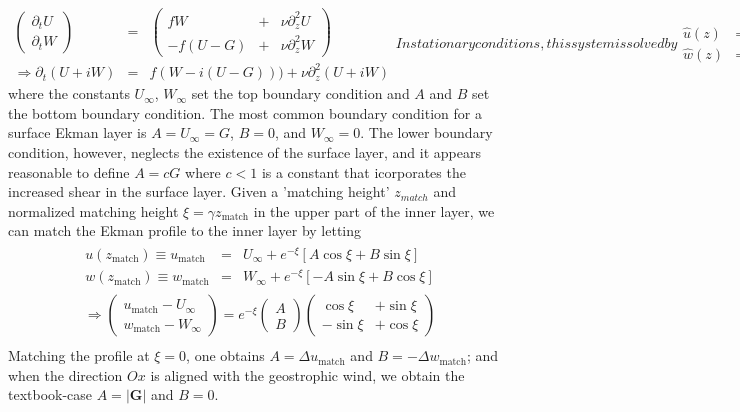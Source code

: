 \documentclass[smallcondensed,final]{svjour3}
\newcommand{\p}{\partial}
\newcommand{\gzm}{{\xi}}%
\begin{document}
\begin{subequations}
\begin{eqnarray}
  \left(\begin{matrix}
    \p_t U\\
    \p_t W  
  \end{matrix}\right)&=&\left(\begin{matrix}
     fW &+& \nu \p_z^2 U\\ 
    -f(U-G) &+& \nu \p_z^2 W
  \end{matrix}\right)\\ 
  \Rightarrow \partial_t (U+iW) &=& f(W-i(U-G))) + \nu \p_z^2(U+iW)
\end{eqnarray}
In stationary conditions, this system is solved by
\begin{eqnarray}
  \hat{u}(z) &=& U_{\infty} + e^{-\gamma z} \left[A \cos\gamma z + B \sin\gamma z\right]   \\
  \hat{w}(z) &=& W_{\infty} + e^{-\gamma z} \left[-A \sin\gamma z + B \cos\gamma z\right]
\end{eqnarray} 
\end{subequations}
where the constants $U_\infty$, $W_\infty$ set the top boundary condition and $A$ and $B$ set the bottom boundary condition. 
%
The most common boundary condition for a surface Ekman layer is $A=U_{\infty}=G$, $B=0$, and $W_{\infty}=0$.
%
The lower boundary condition, however, neglects the existence of the surface layer, and it appears reasonable to define
$A=c G$ where $c<1$ is a constant that icorporates the increased shear in the surface layer.
%
Given a 'matching height' $z_{match}$ and normalized matching height $\xi=\gamma z_\text{match}$ in the upper part of the inner layer, we can match the Ekman profile
to the inner layer by letting
%
\begin{eqnarray}
  \begin{matrix} 
    u(z_\text{match}) \equiv u_\text{match} &=& U_{\infty} + e^{-\gzm} \left [ A \cos\gzm + B\sin\gzm \right] \\
    w(z_\text{match}) \equiv w_\text{match} &=& W_{\infty} + e^{-\gzm} \left [-A \sin\gzm + B\cos\gzm \right]
  \end{matrix} 
\end{eqnarray}
\begin{eqnarray}
  \Rightarrow \left(\begin{matrix}
    u_\text{match}-U_{\infty} \\ 
    w_\text{match}-W_{\infty}
  \end{matrix}\right) = e^{-\gzm}\left(\begin{matrix}A \\ B \end{matrix}\right)\left(\begin{matrix}
    \cos\gzm &+ \sin\gzm \\ -\sin\gzm &+ \cos\gzm
  \end{matrix} \right) \\
\end{eqnarray}
Matching the profile at $\xi=0$, one obtains
$A = \Delta u_\text{match} $ and $B=-\Delta w_\text{match} $; and when the direction $Ox$ is aligned
with the geostrophic wind, we obtain the textbook-case $A=|\mathbf{G}|$ and $B=0$. 
\end{document}
